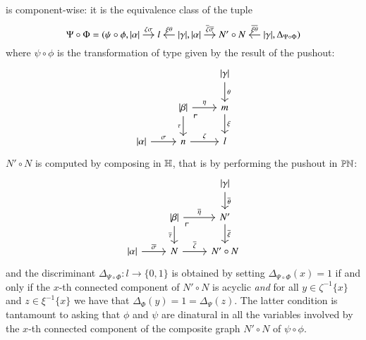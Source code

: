\begin{definition}
\begin{itemize}[leftmargin=*]
\[\]
is component-wise: it is the equivalence class of the tuple 
\begin{equation}\label{eqn:composition in {B,C}}
\Psi \circ \Phi = (
\psi\circ\phi,
\begin{tikzcd}[cramped,sep=small]
\length\alpha \ar[r,"\zeta\sigma"] & l & \ar[l,"\xi\theta"'] \length\gamma
\end{tikzcd},
\begin{tikzcd}[cramped,sep=small]
\length\alpha \ar[r,"\overline\zeta \overline\sigma"] & {N'} \circ N & \ar[l,"\overline\xi \overline\theta"'] \length\gamma
\end{tikzcd},
\Delta_{\Psi\circ\Phi}
)
\end{equation} 
where $\psi\circ\phi$ is the transformation of type given by the result of the pushout:
\[
\begin{tikzcd}
& & \length\gamma \ar[d,"\theta"] \\
& \length\beta \ar[d,"\tau"'] \ar[r,"\eta"] \ar[dr, phantom, "\ulcorner" very near start] & m \ar[d,"\xi"] \\
\length\alpha \ar[r,"\sigma"] & n \ar[r,"\zeta"] & l
\end{tikzcd}
\]
	$N' \circ N$ is computed by composing in $\mathbb H$, that is by performing the pushout in $\mathbb{PN}$:
    \[
    \begin{tikzcd}
    & & \length\gamma \ar[d,"\overline\theta"] \\
    & \length\beta \ar[d,"\overline\tau"'] \ar[r,"\overline\eta"] \ar[dr, phantom, "\ulcorner" very near start] & N' \ar[d,"\overline\xi"] \\
    \length\alpha \ar[r,"\overline\sigma"] & N \ar[r,"\overline\zeta"] & N' \circ N
    \end{tikzcd}
    \]
    and the discriminant $\Delta_{\Psi\circ\Phi} \colon l \to \{0,1\}$ is obtained by setting $\Delta_{\Psi\circ\Phi} (x) = 1$ if and only if the $x$-th connected component of $N'\circ N$ is acyclic \emph{and} for all $y \in \zeta^{-1}\{x\}$ and $z \in \xi^{-1}\{x\}$ we have that $\Delta_\Phi(y) = 1 = \Delta_\Psi(z)$. The latter condition is tantamount to asking that $\phi$ and $\psi$ are dinatural in all the variables involved by the $x$-th connected component of the composite graph ${N'}\circ N$ of $\psi\circ\phi$.
\end{itemize}
\end{definition}

